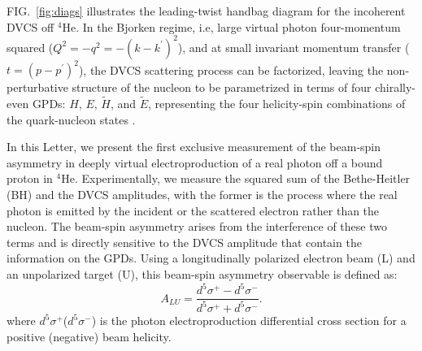 \documentclass[twocolumn,nofootinbib,showpacs,prl,superscriptaddress,secnumarabic,amssymb,nobibnotes,aps,floatfix]{revtex4}
\begin{document}
FIG.~\ref{fig:diags} illustrates the 
leading-twist handbag diagram for the incoherent DVCS off $^{4}$He. In the 
Bjorken regime, i.e, large virtual photon four-momentum squared 
($Q^{2}=-q^2=-(k-k^\prime)^2$), and at small invariant momentum transfer ($t=(p-p^\prime)^2$), the 
DVCS scattering process can be factorized, leaving the non-perturbative structure 
of the nucleon to be parametrized in terms of four chirally-even GPDs: $H$, 
$E$, $\widetilde{H}$, and $\widetilde{E}$, representing the four helicity-spin 
combinations of the quark-nucleon states \cite{Freund_Collins,Ji_Osborne}.

In this Letter, we present the first exclusive measurement of the beam-spin 
asymmetry in deeply virtual electroproduction of a real photon off a bound 
proton in $^{4}$He. Experimentally, we measure the squared sum of the 
Bethe-Heitler (BH) and the DVCS amplitudes, with the former is the process 
where the real photon is emitted by the incident or the scattered electron 
rather than the nucleon. The beam-spin asymmetry arises from the interference 
of these two terms and is directly sensitive to the DVCS amplitude that contain 
the information on the GPDs.  Using a longitudinally polarized electron beam 
(L) and an unpolarized target (U), this beam-spin asymmetry observable is 
defined as:
\begin{equation}
  A_{LU} = \frac{d^{5}\sigma^{+} - d^{5}\sigma^{-} }
                {d^{5}\sigma^{+} + d^{5}\sigma^{-}}.
    \label{BSA_equation}
  \end{equation}
where $d^{5}\sigma^{+}$($d^{5}\sigma^{-}$) is the photon electroproduction 
differential cross section for a positive (negative) beam helicity. 
\end{document}
